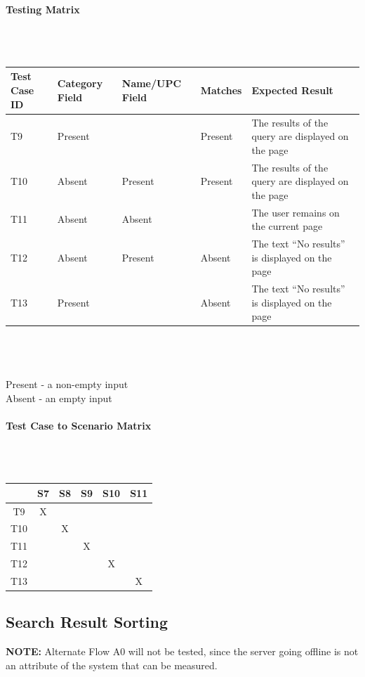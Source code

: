 \documentclass{article}
\begin{document}
\paragraph{Testing Matrix}~\\ \\
\begin{tabular}{ p{0.8in}  p{0.5in} p{0.7in}  p{0.5in}  p{3in} }
\hline
Test Case ID & Category Field & Name/UPC Field & Matches & Expected Result\\
\hline
\hline
T9 & Present &  & Present & The results of the query are displayed on the page\\
\hline
T10 & Absent & Present & Present & The results of the query are displayed on the page\\
\hline
T11 & Absent & Absent &  & The user remains on the current page\\
\hline
T12 & Absent & Present & Absent & The text ``No results'' is displayed on the page\\
\hline
T13 & Present &  & Absent & The text ``No results'' is displayed on the page\\
\hline
\end{tabular}\\
~\\
~\\
Present - a non-empty input\\
Absent - an empty input
\paragraph{Test Case to Scenario Matrix}~\\ \\
\begin{tabular}{ | c || c | c | c | c | c | }
\hline
    & S7  & S8  & S9  & S10 & S11 \\
\hline
\hline
T9  &  X  &     &     &     &     \\
\hline
T10 &     &  X  &     &     &     \\
\hline
T11 &     &     &  X  &     &     \\
\hline
T12 &     &     &     &  X  &     \\
\hline
T13 &     &     &     &     &  X  \\
\hline
\end{tabular}

\subsection{Search Result Sorting}
\textbf{NOTE:} Alternate Flow A0 will not be tested, since the server going offline is not an attribute of the system that can be measured.
\end{document}
